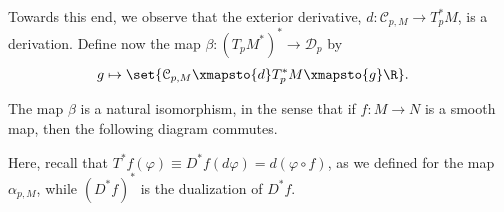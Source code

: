 \documentclass[10pt]{mypackage}
\begin{document}
Towards this end, we observe that the exterior derivative, $d\colon \mathcal{C}_{p,M}\rightarrow T_p^{\ast}M$, is a derivation. Define now the map $\beta\colon \left( T_pM^{\ast} \right)^{\ast} \rightarrow \mathcal{D}_p$ by
\begin{align*}
  g &\mapsto \set{\mathcal{C}_{p,M}\xmapsto{d} T_p^{\ast}M\xmapsto{g} \R}.
\end{align*}
\begin{proposition}
  The map $\beta$ is a natural isomorphism, in the sense that if $f\colon M\rightarrow N$ is a smooth map, then the following diagram commutes.
  \begin{center}
  \end{center}
\end{proposition}
Here, recall that $T^{\ast}f\left( \varphi \right) \equiv D^{\ast}f\left( d\varphi \right) = d\left( \varphi\circ f \right)$, as we defined for the map $\alpha_{p,M}$, while $ \left( D^{\ast}f \right)^{\ast} $ is the dualization of $ D^{\ast}f $.\newline
\end{document}
